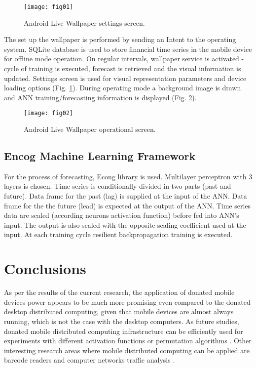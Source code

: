 \documentclass{llncs}
\begin{document}
\begin{figure}[h]
  \centering
  \texttt{[image: fig01]}
  \caption{Android Live Wallpaper settings screen.}
\label{fig:01}
\end{figure}

The set up the wallpaper is performed by sending an Intent to the operating system. SQLite database is used to store financial time series in the mobile device for offline mode operation. On regular intervals, wallpaper service is activated - cycle of training is executed, forecast is retrieved and the visual information is updated. Settings screen is used for visual representation parameters and device loading options (Fig. \ref{fig:01}). During operating mode a background image is drawn and ANN training/forecasting information is displayed (Fig. \ref{fig:02}). 

\begin{figure}[h]
  \centering
  \texttt{[image: fig02]}
  \caption{Android Live Wallpaper operational screen.}
\label{fig:02}
\end{figure}

\subsection{Encog Machine Learning Framework}

For the process of forecasting, Econg library is used. Multilayer perceptron with 3 layers is chosen. Time series is conditionally divided in two parts (past and future). Data frame for the past (lag) is supplied at the input of the ANN. Data frame for the the future (lead) is expected at the output of the ANN. Time series data are scaled (according neurons activation function) before fed into ANN's input. The output is also scaled with the opposite scaling coefficient used at the input. At each training cycle resilient backpropagation training is executed. 

\section{Conclusions}

As per the results of the current research, the application of donated mobile devices power appears to be much more promising even compared to the donated desktop distributed computing, given that mobile devices are almost always running, which is not the case with the desktop computers. As future studies, donated mobile distributed computing infrastructure can be efficiently used for experiments with different activation functions \cite{zankinski01} or permutation algorithms \cite{zankinski02}. Other interesting research areas where mobile distributed computing can be applied are barcode readers \cite{atanasova02} and computer networks traffic analysis \cite{tashev01,tashev02}.
\end{document}
